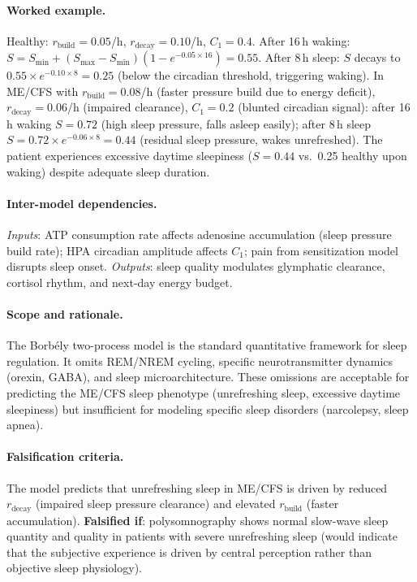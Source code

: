 \paragraph{Worked example.}
Healthy: $r_{\text{build}} = 0.05$/h, $r_{\text{decay}} = 0.10$/h, $C_1 = 0.4$. After 16\,h waking: $S = S_{\min} + (S_{\max} - S_{\min})(1 - e^{-0.05 \times 16}) = 0.55$. After 8\,h sleep: $S$ decays to $0.55 \times e^{-0.10 \times 8} = 0.25$ (below the circadian threshold, triggering waking). In ME/CFS with $r_{\text{build}} = 0.08$/h (faster pressure build due to energy deficit), $r_{\text{decay}} = 0.06$/h (impaired clearance), $C_1 = 0.2$ (blunted circadian signal): after 16\,h waking $S = 0.72$ (high sleep pressure, falls asleep easily); after 8\,h sleep $S = 0.72 \times e^{-0.06 \times 8} = 0.44$ (residual sleep pressure, wakes unrefreshed). The patient experiences excessive daytime sleepiness ($S = 0.44$ vs.\ 0.25 healthy upon waking) despite adequate sleep duration.

\paragraph{Inter-model dependencies.}
\emph{Inputs}: ATP consumption rate affects adenosine accumulation (sleep pressure build rate); HPA circadian amplitude affects $C_1$; pain from sensitization model disrupts sleep onset. \emph{Outputs}: sleep quality modulates glymphatic clearance, cortisol rhythm, and next-day energy budget.

\paragraph{Scope and rationale.}
The Borb\'{e}ly two-process model is the standard quantitative framework for sleep regulation. It omits REM/NREM cycling, specific neurotransmitter dynamics (orexin, GABA), and sleep microarchitecture. These omissions are acceptable for predicting the ME/CFS sleep phenotype (unrefreshing sleep, excessive daytime sleepiness) but insufficient for modeling specific sleep disorders (narcolepsy, sleep apnea).

\paragraph{Falsification criteria.}
The model predicts that unrefreshing sleep in ME/CFS is driven by reduced $r_{\text{decay}}$ (impaired sleep pressure clearance) and elevated $r_{\text{build}}$ (faster accumulation). \textbf{Falsified if}: polysomnography shows normal slow-wave sleep quantity and quality in patients with severe unrefreshing sleep (would indicate that the subjective experience is driven by central perception rather than objective sleep physiology).

